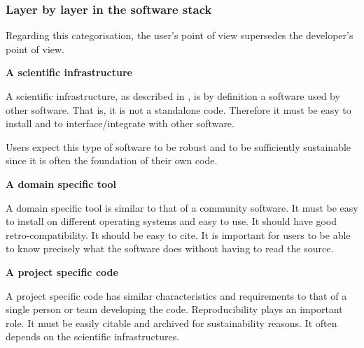 \subsubsection{Layer by layer in the software stack}

Regarding this categorisation, the user's point of view supersedes the developer's point of view.

\textbf{A scientific infrastructure}

A scientific infrastructure, as described in \cite{hinsen2019}, is by definition a software used by other software. That is, it is not a standalone code. Therefore it must be easy to install and to interface/integrate with other software.

Users expect this type of software to be robust and to be sufficiently sustainable since it is often the foundation of their own code.

\textbf{A domain specific tool}

A domain specific tool is similar to that of a community software. It must be easy to install on different operating systems and easy to use. It should have good retro-compatibility. It should be easy to cite. It is important for users to be able to know precisely what the software does without having to read the source. 

\textbf{A project specific code}

A project specific code has similar characteristics and requirements to that of a single person or team developing the code. Reproducibility plays an important role. It must be easily citable and archived for sustainability reasons. It often depends on the scientific infrastructures.
